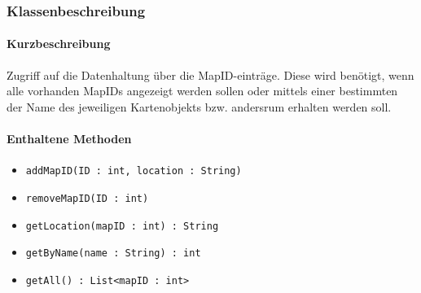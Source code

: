 \subsubsection*{Klassenbeschreibung}%
\paragraph*{Kurzbeschreibung}
Zugriff auf die Datenhaltung über die MapID-einträge. Diese wird benötigt, wenn alle vorhanden MapIDs angezeigt werden sollen oder
mittels einer bestimmten der Name des jeweiligen Kartenobjekts bzw. andersrum erhalten werden soll.

\paragraph*{Enthaltene Methoden}
\begin{itemize}
    \item \texttt{addMapID(ID : int, location : String)}
    \item \texttt{removeMapID(ID : int)}
    \item \texttt{getLocation(mapID : int) : String}
    \item \texttt{getByName(name : String) : int}
    \item \texttt{getAll() : List<mapID : int>}
\end{itemize}
